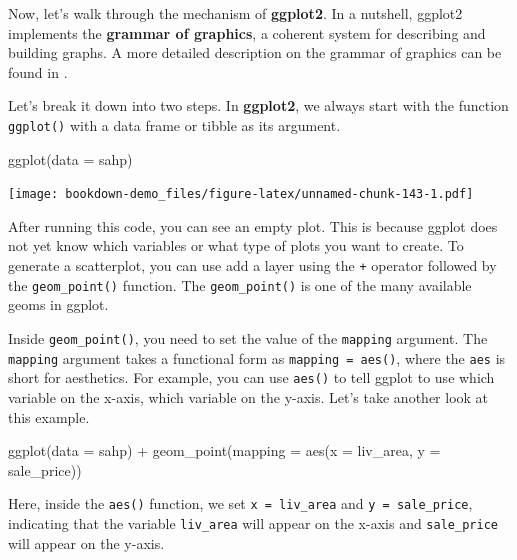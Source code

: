 \documentclass[
]{book}
\newenvironment{Shaded}{\begin{snugshade}}{\end{snugshade}}
\newcommand{\AttributeTok}[1]{\textcolor[rgb]{0.77,0.63,0.00}{#1}}
\newcommand{\FunctionTok}[1]{\textcolor[rgb]{0.00,0.00,0.00}{#1}}
\newcommand{\NormalTok}[1]{#1}
\newcommand{\SpecialCharTok}[1]{\textcolor[rgb]{0.00,0.00,0.00}{#1}}
\begin{document}
Now, let's walk through the mechanism of \textbf{ggplot2}. In a nutshell, ggplot2 implements the \textbf{grammar of graphics}, a coherent system for describing and building graphs. A more detailed description on the grammar of graphics can be found in \citet{wickham2010layered}.

Let's break it down into two steps. In \textbf{ggplot2}, we always start with the function \texttt{ggplot()} with a data frame or tibble as its argument.

\begin{Shaded}
\begin{Highlighting}[]
\FunctionTok{ggplot}\NormalTok{(}\AttributeTok{data =}\NormalTok{ sahp)}
\end{Highlighting}
\end{Shaded}

\texttt{[image: bookdown-demo\_files/figure-latex/unnamed-chunk-143-1.pdf]}

After running this code, you can see an empty plot. This is because ggplot does not yet know which variables or what type of plots you want to create. To generate a scatterplot, you can use add a layer using the \texttt{+} operator followed by the \texttt{geom\_point()} function. The \texttt{geom\_point()} is one of the many available geoms in ggplot.

Inside \texttt{geom\_point()}, you need to set the value of the \texttt{mapping} argument. The \texttt{mapping} argument takes a functional form as \texttt{mapping\ =\ aes()}, where the \texttt{aes} is short for aesthetics. For example, you can use \texttt{aes()} to tell ggplot to use which variable on the x-axis, which variable on the y-axis. Let's take another look at this example.

\begin{Shaded}
\begin{Highlighting}[]
\FunctionTok{ggplot}\NormalTok{(}\AttributeTok{data =}\NormalTok{ sahp) }\SpecialCharTok{+} \FunctionTok{geom\_point}\NormalTok{(}\AttributeTok{mapping =} \FunctionTok{aes}\NormalTok{(}\AttributeTok{x =}\NormalTok{ liv\_area, }\AttributeTok{y =}\NormalTok{ sale\_price))}
\end{Highlighting}
\end{Shaded}

Here, inside the \texttt{aes()} function, we set \texttt{x\ =\ liv\_area} and \texttt{y\ =\ sale\_price}, indicating that the variable \texttt{liv\_area} will appear on the x-axis and \texttt{sale\_price} will appear on the y-axis.
\end{document}
